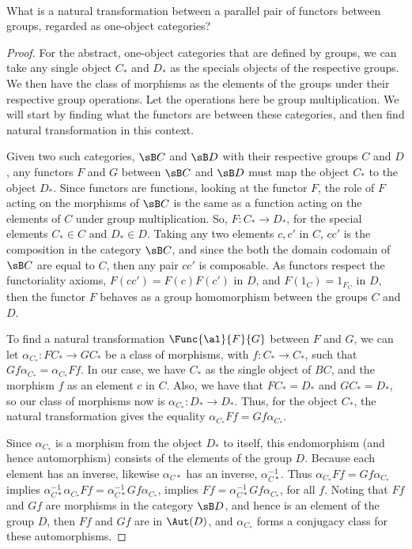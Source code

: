 \documentclass[main.tex]{subfiles}
\begin{document}
\paragraph{}
\begin{exercise}
	What is a natural transformation between a parallel pair of functors between
	groups, regarded as one-object categories?
\end{exercise}

\begin{proof}
	For the abstract, one-object categories that are defined by groups, we can
	take any single object $C_*$ and $D_*$ as the specials objects of the
	respective groups. We then have the class of morphisms as the elements of
	the groups under their respective group operations. Let the operations here
	be group multiplication. We will start by finding what the functors are
	between these categories, and then find natural transformation in this
	context.

	Given two such categories, $\sB C$ and $\sB D$ with their respective groups $C$
	and $D$, any functors $F$ and $G$ between $\sB C$ and $\sB D$ must map the object
	$C_*$ to the object $D_*$. Since functors are functions, looking at the
	functor $F$, the role of $F$ acting on the morphisms of $\sB C$ is the same as
	a function acting on the elements of $C$ under group multiplication. So, $F:
	C_* \rightarrow D_*$, for the special elements $C_* \in C$ and $D_* \in D$.
	Taking any two elements $c, c'$ in $C$, $cc'$ is the composition in the
	category $\sB C$, and since the both the domain codomain of $\sB C$ are equal to $ C $, then any pair
	$cc'$ is composable. As functors respect the functoriality axioms, $F(cc') =
	F(c)F(c')$ in $D$, and $F(1_C) = 1_{F_C}$ in $D$, then the functor $F$
	behaves as a group homomorphism between the groups $C$ and $D$.

	To find a natural transformation $\Func{\al}{F}{G}$ between $F$ and $G$,
	we can let $\alpha_{C_*}\colon FC_* \rightarrow GC_*$ be a class of morphisms,
	with $f\colon C_* \rightarrow C_*$, such that $Gf\alpha_{C_*} = \alpha_{C_*}Ff$.
	In our case, we have $C_*$ as the single object of $BC$, and the morphism
	$f$ as an element $c$ in $C$. Also, we have that $FC_* = D_*$ and $GC_* =
	D_*$, so our class of morphisms now is $\alpha_{C_*}\colon D_* \rightarrow D_*$.
	Thus, for the object $C_*$, the natural transformation gives the equality
	$\alpha_{C_*}Ff = Gf \alpha_{C_*}$.

	Since $\alpha_{C_*}$ is a morphism from the object $D_*$ to itself, this
	endomorphism (and hence automorphism) consists of the elements of the group
	$D$. Because each element has an inverse, likewise $\alpha_{C*}$ has an
	inverse, $\alpha_{C*}^{-1}$. Thus $\alpha_{C_*}Ff = Gf \alpha_{C_*}$ implies
	$\alpha_{C*}^{-1} \alpha_{C_*}Ff = \alpha_{C*}^{-1} Gf \alpha_{C_*}$,
	implies $Ff = \alpha_{C*}^{-1} Gf \alpha_{C_*}$, for all $f$. Noting that
	$Ff$ and $Gf$ are morphisms in the category $\sB D$, and hence is an element of
	the group $D$, then $Ff$ and $Gf$ are in $\Aut(D)$, and $\alpha_{C_*}$ forms
	a conjugacy class for these automorphisms.
\end{proof}
\end{document}
